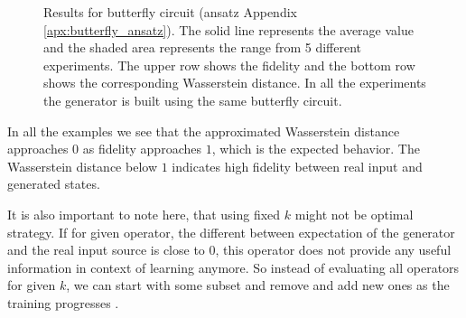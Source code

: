 \begin{figure}[htbp!]
  \caption{Results for butterfly circuit (ansatz Appendix \ref{apx:butterfly_ansatz}).
    The solid line represents the average value and the shaded area
    represents the range from 5 different experiments. The upper row shows the
    fidelity and the bottom row shows the corresponding Wasserstein distance. In all the
    experiments the generator is built using the same butterfly circuit.}
  \label{fig:wqgans_res_butterfly_same}
\end{figure}


In all the examples we see that the approximated Wasserstein distance approaches $0$
as fidelity approaches $1$, which is the expected behavior. The Wasserstein
distance below $1$ indicates high fidelity between real input and generated
states.

It is also important to note here, that using fixed $k$ might not be optimal
strategy. If for given operator, the different between expectation of the
generator and the real input source is close to $0$, this operator does not
provide any useful information in context of learning anymore. So instead of
evaluating all operators for given $k$, we can start with some subset and
remove and add new ones as the training progresses \cite{kiani2021quantum}. 
